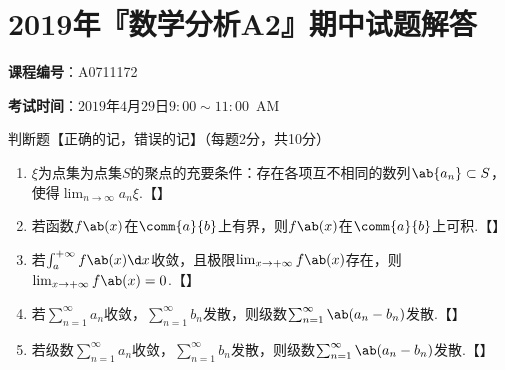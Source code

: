 \chapter{2019年『数学分析A2』期中试题解答}
\vspace{4em}
\hspace{-2.16em}
\begin{minipage}{0.48\textwidth}
    \textbf{课程编号}：A0711172
\end{minipage}
\hfill
\begin{minipage}{0.48\textwidth}
    \textbf{考试时间}：$2019$年$4$月$29$日\quad $9:00\sim 11:00$\ AM
\end{minipage}
\begin{exercise}
    判断题【正确的记\faCheckCircleO，错误的记\faTimesCircleO】（每题2分，共10分）
\begin{enumerate}
    \item $\xi$为点集为点集$S$的聚点的充要条件：存在各项互不相同的数列$\ab{a_n}\subset S$，使得$\lim_{n\to\infty}{a_n}\xi$.\hfill【\qquad】
    \begin{solution}
    
    \end{solution}

    \item 若函数$f\ab(x)$在$\comm{a}{b}$上有界，则$f\ab(x)$在$\comm{a}{b}$上可积.\hfill【\qquad】
    \begin{solution}
    
    \end{solution}

    \item 若$\int_a^{+\infty}{f\ab(x)\d x}$收敛，且极限$\lim_{x\to+\infty}{f\ab(x)}$存在，则$\lim_{x\to+\infty}{f\ab(x)}=0$.\hfill【\qquad】
    \begin{solution}
    
    \end{solution}

    \item 若$\sum_{n=1}^{\infty}{a_n}$收敛，$\sum_{n=1}^{\infty}{b_n}$发散，则级数$\sum_{n=1}^{\infty}{\ab(a_n-b_n)}$发散.\hfill【\qquad】
    \begin{solution}
    
    \end{solution}

    \item 若级数$\sum_{n=1}^{\infty}{a_n}$收敛，$\sum_{n=1}^{\infty}{b_n}$发散，则级数$\sum_{n=1}^{\infty}{\ab(a_n-b_n)}$发散.\hfill【\qquad】
    \begin{solution}
    
    \end{solution}
\end{enumerate}
\end{exercise}

